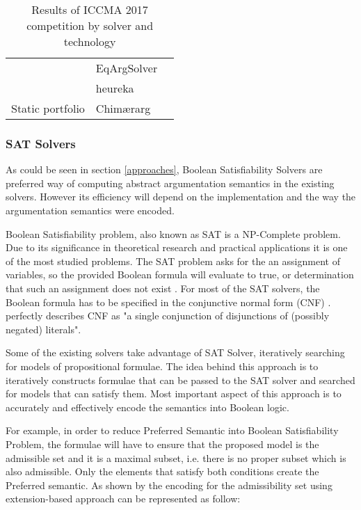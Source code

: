 \begin{table}[]
\begin{tabular}{lll}
		\multicolumn{1}{l|}{}                                         & EqArgSolver                 &                         \\ \cline{2-3} 
		\multicolumn{1}{l|}{}                                         & heureka                     &                         \\ \hline
		\multicolumn{1}{l|}{Static portfolio}                        & Chim\ae rarg &                         \\ \hline
	\end{tabular}
	\caption{Results of ICCMA 2017 competition by solver and technology}
	\label{table:iccmaResultsbySolver}
\end{table}

\subsubsection{SAT Solvers}
As could be seen in section \ref{approaches}, Boolean Satisfiability Solvers are preferred way of computing abstract argumentation semantics in the existing solvers. However its efficiency will depend on the implementation and the way the argumentation semantics were encoded. 

Boolean Satisfiability problem, also known as SAT is a NP-Complete problem. Due to its significance in theoretical research and practical applications it is one of the most studied problems. The SAT problem asks for the an assignment of variables, so the provided Boolean formula will evaluate to true, or determination that such an assignment does not exist \citep{satSolver1}. For most of the SAT solvers, the Boolean formula has to be specified in the conjunctive normal form (CNF) \citep{SatSolver2}. \citet{cnfDefinition} perfectly describes CNF as "a single conjunction of disjunctions of (possibly negated) literals". 

Some of the existing solvers take advantage of SAT Solver, iteratively searching for models of propositional formulae. The idea behind this approach is to iteratively constructs formulae that can be passed to the SAT solver and searched for models that can satisfy them. Most important aspect of this approach is to accurately and effectively encode the semantics into Boolean logic. 

For example, in order to reduce Preferred Semantic into Boolean Satisfiability Problem, the formulae will have to ensure that the proposed model is the admissible set and it is a maximal subset, i.e. there is no proper subset which is also admissible. Only the elements that satisfy both conditions create the Preferred semantic. As shown by \citet{reasoningInArgumentationFr} the encoding for the admissibility set using extension-based approach can be represented as follow:

